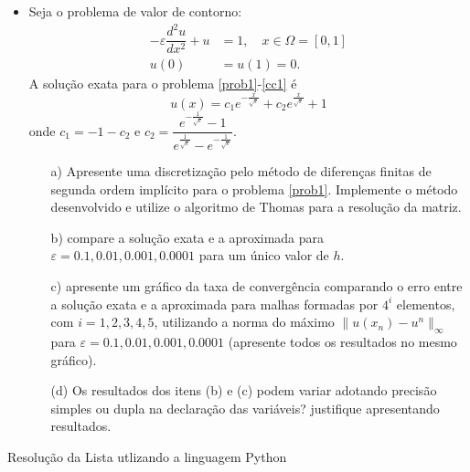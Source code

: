 \documentclass{article}
\newcounter{execs}
\newcommand{\exec}[0]{\addtocounter{execs}{1}\item[\textbf{\arabic{execs}.}]}
\begin{document}
\begin{itemize}
\exec Seja o problema de valor de contorno:
\begin{align} \label{prob1}
- \varepsilon\dfrac{d^2 u}{d x^2} + u &= 1, \quad x\in \Omega= [0,1]
 \\ \label{cc1}
 u(0)&=u(1)=0.
\end{align}
A solução exata para o problema \eqref{prob1}-\eqref{cc1} é
\begin{equation}\label{solexat1}
u(x) = c_1 e^{-\tfrac{x}{\sqrt{\varepsilon}}} + c_2 e^{\tfrac{x}{\sqrt{\varepsilon}}}+1
\end{equation}
onde $c_1 = -1-c_2$ e $c_2 = \dfrac{e^{-\tfrac{1}{\sqrt{\varepsilon}}}-1}
{e^{\tfrac{1}{\sqrt{\varepsilon}}}-e^{-\tfrac{1}{\sqrt{\varepsilon}}}}$.

\begin{itemize}

\item[a)] Apresente uma discretização pelo método de diferenças finitas de segunda ordem implícito para o problema \eqref{prob1}. Implemente o método desenvolvido e utilize o algoritmo de Thomas para a resolução da matriz.
  
  
\item[b)] compare a solução exata e a aproximada para $\varepsilon = 0.1, 0.01, 0.001, 0.0001$
para um único valor de $h$.

\item[c)] apresente um gráfico da taxa de convergência comparando o erro 
entre a solução exata e a aproximada para malhas formadas por $4^i$ elementos, 
com $i=1,2,3,4,5$, utilizando a norma do máximo $\|u(x_n) - u^n\|_{\infty}$ para $\varepsilon = 0.1, 0.01, 0.001, 0.0001$ (apresente todos os resultados no mesmo gráfico).

 \item[(d)] Os resultados dos itens (b) e (c) podem variar adotando precisão simples ou dupla na declaração das variáveis? justifique apresentando resultados.
 
\end{itemize}

\end{itemize}

\newpage

\text Resolução da Lista utlizando a linguagem	 Python
\end{document}
